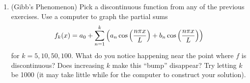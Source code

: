 \begin{enumerate}
\item (Gibb's Phenomenon) Pick a discontinuous function from any of the previous exercises. Use a computer to graph the partial sums $$f_k(x) = \displaystyle a_0+\sum_{n=1}^k \left( a_n\cos\left(\frac{n\pi x}{L}\right) + b_n\cos\left(\frac{n\pi x}{L}\right)\right)$$ for $k=5,10,50,100$. What do you notice happening near the point where $f$ is discontinuous?  Does increasing $k$ make this ``bump'' disappear? Try letting $k$ be 1000 (it may take little while for the computer to construct your solution). 

\end{enumerate}